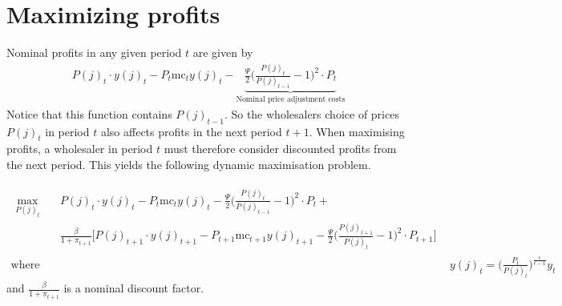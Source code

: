 \documentclass[11pt,a4paper,oneside]{book}
\begin{document}
\section{Maximizing profits}
Nominal profits in any given period $t$ are given by
\begin{align*}
	P(j)_t\cdot y(j)_t -P_t \text{mc}_ty(j)_t-\underbrace{\frac{\Psi}{2}\bigg(\frac{P(j)_t}{P(j)_{t-1}}-1\bigg)^2\cdot P_{t}}_{\text{Nominal price adjustment costs}}
\end{align*}
Notice that this function contains $P(j)_{t-1}$. So the wholesalers choice of prices $P(j)_{t}$ in period $t$ also affects profits in the next period $t+1$. When maximising profits, a wholesaler in period $t$ must therefore consider discounted profits from the next period. This yields the following dynamic maximisation problem.

\begin{align}
	\begin{split}
	\max_{P(j)_t} \quad 
	& P(j)_t\cdot y(j)_t -P_t \text{mc}_ty(j)_t-\frac{\Psi}{2}\bigg(\frac{P(j)_t}{P(j)_{t-1}}-1\bigg)^2\cdot P_{t}+
	\\&\frac{\beta}{1+\pi_{t+1}}\bigg[P(j)_{t+1}\cdot y(j)_{t+1}-P_{t+1} \text{mc}_{t+1}y(j)_{t+1}-\frac{\Psi}{2}\bigg(\frac{P(j)_{t+1}}{P(j)_{t}}-1\bigg)^2\cdot P_{t+1}\bigg]
	\end{split}\\
	\text{where }\quad & y(j)_t = \bigg(\frac{P_t}{P(j)_t}\bigg)^{\frac{\epsilon}{\epsilon-1}}y_t
\end{align}
and $\frac{\beta }{ 1+\pi _{t+1} } $ is a nominal discount factor.
\end{document}
